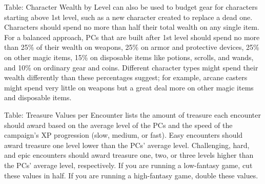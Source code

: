 Table: Character Wealth by Level can also be used to budget gear for characters starting above 1st level, such as a new character created to replace a dead one. Characters should spend no more than half their total wealth on any single item. For a balanced approach, PCs that are built after 1st level should spend no more than 25\% of their wealth on weapons, 25\% on armor and protective devices, 25\% on other magic items, 15\% on disposable items like potions, scrolls, and wands, and 10\% on ordinary gear and coins. Different character types might spend their wealth differently than these percentages suggest; for example, arcane casters might spend very little on weapons but a great deal more on other magic items and disposable items.
				
Table: Treasure Values per Encounter lists the amount of treasure each encounter should award based on the average level of the PCs and the speed of the campaign's XP progression (slow, medium, or fast). Easy encounters should award treasure one level lower than the PCs' average level. Challenging, hard, and epic encounters should award treasure one, two, or three levels higher than the PCs' average level, respectively. If you are running a low-fantasy game, cut these values in half. If you are running a high-fantasy game, double these values.
								
